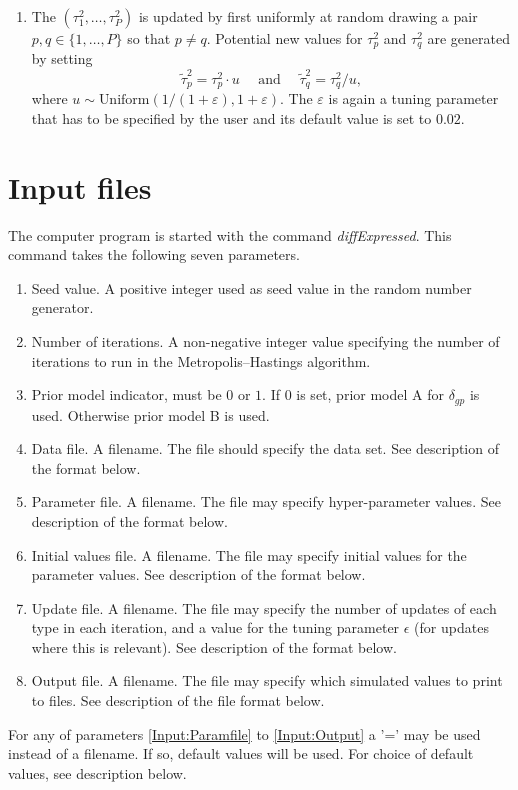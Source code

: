 \documentclass[11pt]{article}
\begin{document}
\begin{enumerate}
\item The $(\tau_1^2,\ldots,\tau_P^2)$ is updated by first uniformly at random drawing a pair $p,q\in \{1,\ldots,P\}$
so that $p\neq q$. Potential new values for $\tau_p^2$ and $\tau_q^2$ are generated by setting
\begin{equation}
\widetilde{\tau}_p^2 = \tau_p^2 \cdot u \mbox{~~~~and~~~~}
\widetilde{\tau}_q^2 = \tau_q^2 / u,
\end{equation}
where $u \sim \mbox{Uniform}(1/(1+\varepsilon),1+\varepsilon)$. The $\varepsilon$ is again a tuning parameter that
has to be specified by the user and its default value is set to $0.02$.
\end{enumerate}


\section{Input files}
The computer program is started with the command {\em diffExpressed}. This command takes the following seven parameters.
\begin{enumerate}
\item Seed value. A positive integer used as seed value in the random number generator.
\item Number of iterations. A non-negative integer value specifying the number of iterations to run 
in the Metropolis--Hastings algorithm.
\item Prior model indicator, must be $0$ or $1$. If $0$ is set, prior model A for $\delta_{gp}$ is used. Otherwise
prior model B is used.
\item Data file. A filename. The file should specify the data set. See description of the format below.
\item \label{Input:Paramfile}Parameter file. A filename. The file may specify hyper-parameter values. See description 
of the format below.
\item Initial values file. A filename. The file may specify initial values for the parameter values.
See description of the format below.
\item Update file. A filename. The file may specify the number of updates of each type in each iteration, and a value for the tuning parameter $\epsilon$ (for 
updates where this is relevant). See
description of the format below.
\item \label{Input:Output}Output file. A filename. The file may specify which simulated values to print to files. See description of
the file format below.
\end{enumerate}
For any of parameters \ref{Input:Paramfile} to \ref{Input:Output} a '=' may be used instead of a filename. If so, default 
values will be used. For choice of default values, see description below. 
\end{document}

